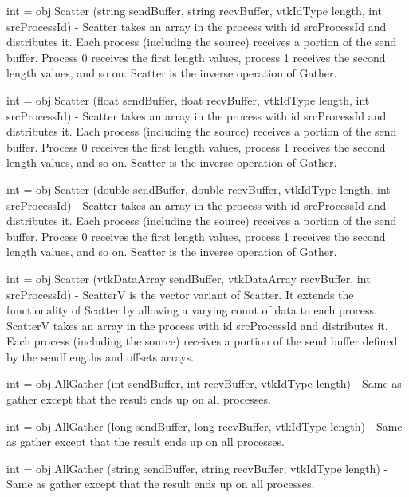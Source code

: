 \begin{DoxyItemize}
\item {\ttfamily int = obj.\-Scatter (string send\-Buffer, string recv\-Buffer, vtk\-Id\-Type length, int src\-Process\-Id)} -\/ Scatter takes an array in the process with id {\ttfamily src\-Process\-Id} and distributes it. Each process (including the source) receives a portion of the send buffer. Process 0 receives the first {\ttfamily length} values, process 1 receives the second {\ttfamily length} values, and so on. Scatter is the inverse operation of Gather.  
\item {\ttfamily int = obj.\-Scatter (float send\-Buffer, float recv\-Buffer, vtk\-Id\-Type length, int src\-Process\-Id)} -\/ Scatter takes an array in the process with id {\ttfamily src\-Process\-Id} and distributes it. Each process (including the source) receives a portion of the send buffer. Process 0 receives the first {\ttfamily length} values, process 1 receives the second {\ttfamily length} values, and so on. Scatter is the inverse operation of Gather.  
\item {\ttfamily int = obj.\-Scatter (double send\-Buffer, double recv\-Buffer, vtk\-Id\-Type length, int src\-Process\-Id)} -\/ Scatter takes an array in the process with id {\ttfamily src\-Process\-Id} and distributes it. Each process (including the source) receives a portion of the send buffer. Process 0 receives the first {\ttfamily length} values, process 1 receives the second {\ttfamily length} values, and so on. Scatter is the inverse operation of Gather.  
\item {\ttfamily int = obj.\-Scatter (vtk\-Data\-Array send\-Buffer, vtk\-Data\-Array recv\-Buffer, int src\-Process\-Id)} -\/ Scatter\-V is the vector variant of Scatter. It extends the functionality of Scatter by allowing a varying count of data to each process. Scatter\-V takes an array in the process with id {\ttfamily src\-Process\-Id} and distributes it. Each process (including the source) receives a portion of the send buffer defined by the {\ttfamily send\-Lengths} and {\ttfamily offsets} arrays.  
\item {\ttfamily int = obj.\-All\-Gather (int send\-Buffer, int recv\-Buffer, vtk\-Id\-Type length)} -\/ Same as gather except that the result ends up on all processes.  
\item {\ttfamily int = obj.\-All\-Gather (long send\-Buffer, long recv\-Buffer, vtk\-Id\-Type length)} -\/ Same as gather except that the result ends up on all processes.  
\item {\ttfamily int = obj.\-All\-Gather (string send\-Buffer, string recv\-Buffer, vtk\-Id\-Type length)} -\/ Same as gather except that the result ends up on all processes.  

\end{DoxyItemize}

